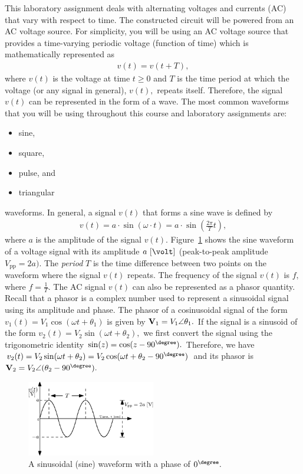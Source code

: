 This laboratory assignment deals with alternating voltages and currents (AC)
that vary with respect to time. The constructed circuit will be powered from an
AC voltage source. For simplicity, you will be using an AC voltage source that
provides a time-varying periodic voltage (function of time) which is mathematically represented
as %
%
\begin{align*}
  v(t) = v(t+T),
\end{align*}
%
where $v(t)$ is the voltage at time $t\ge 0$ and $T$ is the time period at which
the voltage (or any signal in general), $v(t),$ repeats itself. Therefore, the
signal $v(t)$ can be represented in the form of a wave. The most common
waveforms that you will be using throughout this course and laboratory
assignments are: %
%
\begin{itemize}
\item sine,
  
\item square,
  
\item pulse, and
  
\item triangular
\end{itemize}
%
waveforms. In general, a signal $v(t)$ that forms a sine wave is defined by %
%
\begin{align*}
  v(t) = a\cdot\sin(\omega\cdot t)  = a\cdot\sin(\frac{2\pi}{T}t),
\end{align*}
where $a$ is the amplitude of the signal $v(t)$. Figure~\ref{fig:figure1-sinWave} shows the sine waveform of a voltage signal with its amplitude $a~[\volt]$ (peak-to-peak amplitude $V_{\text{pp}} = 2a).$ The \emph{period} $T$ is the time difference between two points on the waveform where the signal $v(t)$ repeats. The frequency of the signal $v(t)$ is $f,$ where $f = \frac{1}{T}.$ The AC signal $v(t)$ can also be represented as a phasor quantity. Recall that a phasor is a complex number used to represent a sinusoidal signal using its amplitude and phase. The phasor of a cosinusoidal signal of the form $v_1(t) = V_1\cos(\omega t + \theta_1)$ is given by ${\bf V}_1 = V_1\angle{\theta_1}.$ If the signal is a sinusoid of the form $v_2(t) =V_2\sin(\omega t +\theta_2),$ we first convert the signal using the trigonometric identity $\sin(z) = \cos(z-90^{\degree}).$ Therefore, we have $v_2(t) =V_2\sin(\omega t +\theta_2) = V_2\cos(\omega t +\theta_2 - 90^{\degree})$ and its phasor is ${\bf V}_2 = V_2\angle{(\theta_2-90^{\degree})}.$ 

\begin{figure}
    \centering
    \includegraphics[width=0.5\textwidth]{figs/ipe/lab5/figure1-sinWave.eps}
    \caption{A sinusoidal (sine) waveform with a phase of $0^{\degree}.$}
    \label{fig:figure1-sinWave}
\end{figure}

